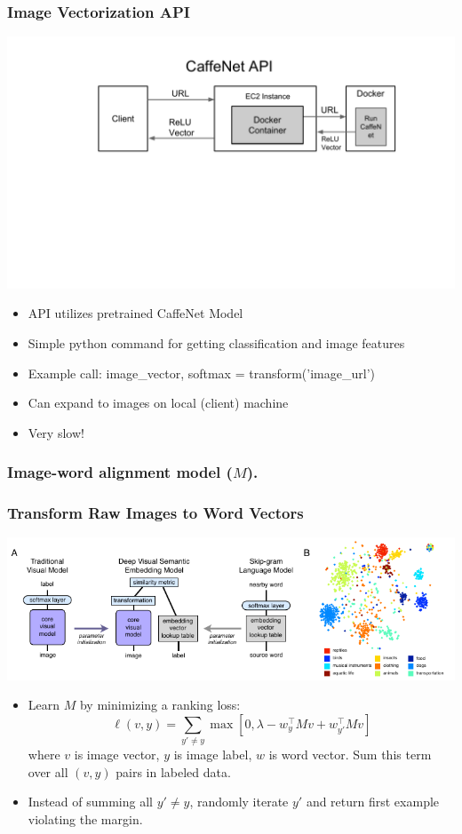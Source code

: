 \documentclass{beamer}
\begin{document}
\begin{frame}
  \frametitle{Image Vectorization API}
  \begin{center}
    \includegraphics[width=\textwidth]{assets/CaffeNetAPI.pdf}
  \end{center}
  \begin{itemize}
    \item API utilizes pretrained CaffeNet Model 
    \item Simple python command for getting classification and image features 
    \item Example call: image_vector, softmax = transform('image_url')
    \item Can expand to images on local (client) machine
    \item Very slow!
  \end{itemize}
\end{frame}

\begin{frame}
  \frametitle{Image-word alignment model ($M$).}
\end{frame}

\begin{frame}
  \frametitle{Transform Raw Images to Word Vectors}
  \begin{center}
    \includegraphics[width=\textwidth]{assets/devise.pdf}
  \end{center}
  \begin{itemize}
    \item Learn $M$ by minimizing a ranking loss: $$\ell(v, y) = \sum_{y' \neq y} \max \left[0, \lambda - w_{y}^\top M v + w_{y'} ^\top M v \right]$$ where $v$ is image vector, $y$ is image label, $w$ is word vector. Sum this term over all $(v, y)$ pairs in labeled data.
    \item Instead of summing all $y' \neq y$, randomly iterate $y'$ and return first example violating the margin.
  \end{itemize}
\end{frame}
\end{document}
